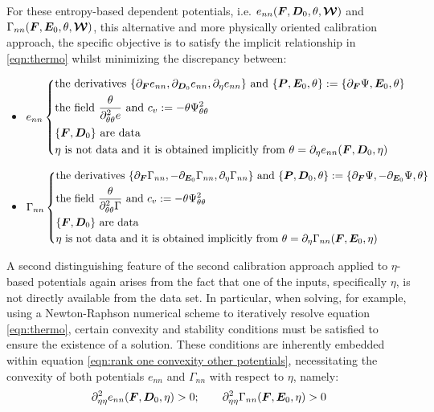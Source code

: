 For these entropy-based dependent potentials, i.e.  $e_{nn}(\boldsymbol{F},\boldsymbol{D}_0,\theta,\boldsymbol{\mathcal{W}})$ and $\Gamma_{nn}(\boldsymbol{F},\boldsymbol{E}_0,\theta,\boldsymbol{\mathcal{W}})$, this  alternative and more physically oriented calibration approach,  the specific objective is to satisfy the implicit relationship in \eqref{eqn:thermo} whilst minimizing the discrepancy between: 
%
\begin{itemize}

	
	\item  \(
	e_{nn}\left\{
	\begin{aligned}
	&\text{the derivatives }  \{\partial_{\boldsymbol{F}}e_{nn},\partial_{\boldsymbol{D}_0}e_{nn},\partial_{\eta}e_{nn}\} \text{ and } \{\boldsymbol{P},\boldsymbol{E}_0,\theta\}:=\{\partial_{\boldsymbol{F}}\Psi,{\boldsymbol{E}_0},\theta\}\\
	&\text{the field } \frac{\theta}{\partial^2_{\theta\theta} e} \text{ and } c_v:=-\theta\Psi^2_{\theta\theta}\\
	&\{\boldsymbol{F},\boldsymbol{D}_0\} \text{ are data }\\
	& \eta \text{ is not data and it is obtained implicitly from } \theta = \partial_{\eta}e_{nn}(\boldsymbol{F},\boldsymbol{D}_0,\eta)	 
	\end{aligned}
	\right.
	\)
	

	
	\item  \(	\Gamma_{nn}\left\{
	\begin{aligned}
	&\text{the derivatives }   \{\partial_{\boldsymbol{F}}\Gamma_{nn},-\partial_{\boldsymbol{E}_0}\Gamma_{nn},\partial_{\eta}\Gamma_{nn}\} \text{ and } \{\boldsymbol{P},\boldsymbol{D}_0,\theta\}:=\{\partial_{\boldsymbol{F}}\Psi,-\partial_{\boldsymbol{E}_0}\Psi,\theta\}\\
	&\text{the field } \frac{\theta}{\partial^2_{\theta\theta} \Gamma} \text{ and } c_v:=-\theta\Psi^2_{\theta\theta}\\
	&\{\boldsymbol{F},\boldsymbol{D}_0\} \text{ are data }\\
	& \eta \text{ is not data and it is obtained implicitly from } \theta = \partial_{\eta}\Gamma_{nn}(\boldsymbol{F},\boldsymbol{E}_0,\eta)	 		
	\end{aligned}
	\right.
	\)	
	
	
	
	
\end{itemize}
%


A second distinguishing feature of the second calibration approach applied to $\eta$-based potentials again arises from the fact that one of the inputs, specifically $\eta$, is not directly available from the data set. In particular, when solving, for example, using a Newton-Raphson numerical scheme to iteratively resolve equation \eqref{eqn:thermo}, certain convexity and stability conditions must be satisfied to ensure the existence of a solution. These conditions are inherently embedded within equation \eqref{eqn:rank one convexity other potentials}, necessitating the convexity of both potentials $e_{nn}$ and $\Gamma_{nn}$ with respect to $\eta$, namely:
%
\begin{equation}\label{eqn:convexity}
\partial^2_{\eta\eta}e_{nn}(\boldsymbol{F},\boldsymbol{D}_0,\eta)>0;\qquad \partial^2_{\eta\eta} \Gamma_{nn}(\boldsymbol{F},\boldsymbol{E}_0,\eta)>0
\end{equation}

